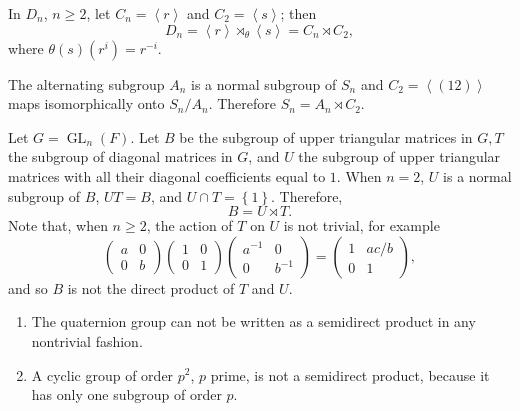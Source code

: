 \begin{example}
  \label{example-dihendral-group-as-semidirect-product}
  In \( D_n \), \( n \geq 2 \), let \( C_n = \left\langle r \right\rangle \) and \( C_2 = \left\langle s \right\rangle \); then
  \[
    D_n = \left\langle r \right\rangle \rtimes_{\theta} \left\langle s \right\rangle = C_n \rtimes C_2,
  \]
  where \( \theta(s)(r^i) = r^{-i} \).
\end{example}

\begin{example}
  \label{example-symmetric-group-as-semidirect-product}
  The alternating subgroup \( A_n \) is a normal subgroup of \( S_n \) and \( C_2 = \left\langle (12) \right\rangle \) maps isomorphically onto \( S_n / A_n \).
  Therefore \( S_n = A_n \rtimes C_2 \).
\end{example}

\begin{example}
  \label{example-upper-triangular-matrices-as-semidirect-product}
  Let \( G = \operatorname{GL}_n(F) \).
  Let \( B \) be the subgroup of upper triangular matrices in \( G, T \) the subgroup of diagonal matrices in \( G \), and \( U \) the subgroup of upper triangular matrices with all their diagonal coefficients equal to \( 1 \).
  When \( n =2 \), \( U \) is a normal subgroup of \( B \), \( UT = B \), and \( U \cap T = \left\lbrace 1 \right\rbrace \).
  Therefore,
  \[
    B = U \rtimes T.
  \]
  Note that, when \( n \geq 2 \), the action of \( T \) on \( U \) is not trivial, for example
  \[
    \begin{pmatrix}
      a & 0\\ 0 & b
    \end{pmatrix} \begin{pmatrix}
      1 & 0\\ 0 & 1
    \end{pmatrix}\begin{pmatrix}
      a^{-1} & 0\\ 0 & b^{-1}
    \end{pmatrix} = \begin{pmatrix}
      1 & ac/b\\ 0 & 1
    \end{pmatrix},
  \]
  and so \( B \) is not the direct product of \( T \) and \( U \).
\end{example}

\begin{example}
  \label{example-group-without-nontrivial-semidirect-product}
  \begin{enumerate}
    \item The quaternion group can not be written as a semidirect product in any nontrivial fashion.
    \item A cyclic group of order \( p^2 \), \( p \) prime, is not a semidirect product, because it has only one subgroup of order \( p \).
  \end{enumerate}
\end{example}

